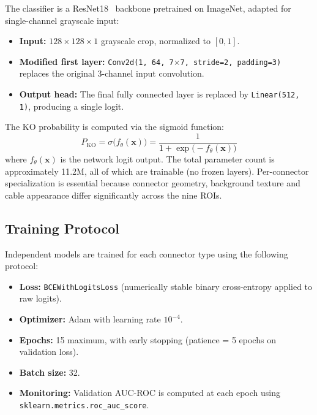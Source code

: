 \documentclass[11pt,a4paper]{article}
\begin{document}
The classifier is a ResNet18~\cite{he2016resnet} backbone pretrained on ImageNet, adapted for single-channel grayscale input:

\begin{itemize}[nosep]
    \item \textbf{Input:} $128 \times 128 \times 1$ grayscale crop, normalized to $[0, 1]$.
    \item \textbf{Modified first layer:} \texttt{Conv2d(1, 64, 7$\times$7, stride=2, padding=3)} replaces the original 3-channel input convolution.
    \item \textbf{Output head:} The final fully connected layer is replaced by \texttt{Linear(512, 1)}, producing a single logit.
\end{itemize}

The KO probability is computed via the sigmoid function:
\begin{equation}
    P_{\mathrm{KO}} = \sigma\bigl(f_\theta(\mathbf{x})\bigr) = \frac{1}{1 + \exp\bigl(-f_\theta(\mathbf{x})\bigr)}
\end{equation}
where $f_\theta(\mathbf{x})$ is the network logit output. The total parameter count is approximately 11.2M, all of which are trainable (no frozen layers). Per-connector specialization is essential because connector geometry, background texture and cable appearance differ significantly across the nine ROIs.

\subsection{Training Protocol}

Independent models are trained for each connector type using the following protocol:

\begin{itemize}[nosep]
    \item \textbf{Loss:} \texttt{BCEWithLogitsLoss} (numerically stable binary cross-entropy applied to raw logits).
    \item \textbf{Optimizer:} Adam with learning rate $10^{-4}$.
    \item \textbf{Epochs:} 15 maximum, with early stopping (patience = 5 epochs on validation loss).
    \item \textbf{Batch size:} 32.
    \item \textbf{Monitoring:} Validation AUC-ROC is computed at each epoch using \texttt{sklearn.metrics.roc\_auc\_score}.
\end{itemize}
\end{document}
